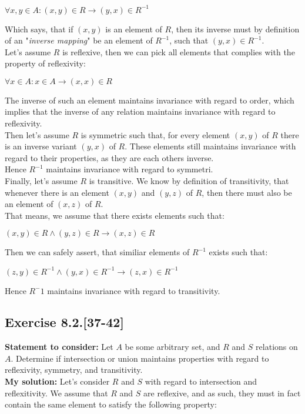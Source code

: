 \documentclass{report}
\newcommand{\cent}[1]{\begin{center}#1\end{center}}
\newcommand{\In}{\! \in \!}
\newcommand{\assignmentDescription}{\textbf{Statement to consider: }}
\newcommand{\solution}{\textbf{My solution: }}
\newcommand{\Exercise}[1]{\subsection{Exercise #1}}
\begin{document}
	\cent{$\forall x,y \In A : (x,y) \In R \to (y,x) \In R^{-1}$}
	
	Which says, that if  $(x,y)$ is an element of $R$, then its inverse must by definition of an "\textit{inverse mapping}" be an element of $R^{-1}$, such that $(y,x) \In R^{-1}$.\\
	
	Let's assume $R$ is reflexive, then we can pick all elements that complies with the property of reflexivity:
	
	\cent{$\forall x \In A : x \In A \to (x,x) \In R$}
	
	The inverse of such an element maintains invariance with regard to order, which implies that the inverse of any relation maintains invariance with regard to reflexivity.\\
	
	Then let's assume $R$ is symmetric such that, for every element $ (x,y) $ of $R$  there is an inverse variant $ (y,x) $ of $R$. These elements still maintains invariance with regard to their properties, as they are each others inverse.\\ 
	
	Hence $R^{-1}$ maintains invariance with regard to symmetri.\\
	
	Finally, let's assume $R$ is transitive. We know by definition of transitivity, that whenever there is an element $(x,y)$ and $ (y,z) $ of $R$, then there must also be an element of $(x,z)$ of $R$.\\
	
	That means, we assume that there exists elements such that:
	
	\cent{$ (x,y) \In R \wedge (y,z) \In R \to (x,z)\In R$}
	
	Then we can safely assert, that similiar elements of  $R^{-1}$ exists such that:
	
	\cent{$ (z,y) \In R^{-1} \wedge (y,x) \In R^{-1} \to (z,x)\In R^{-1}$}
	
	Hence $R^-1$ maintains invariance with regard to transitivity.
	
	\Exercise{8.2.[37-42]}
	
	\assignmentDescription
	Let $A$ be some arbitrary set, and $R$ and $S$ relations on $A$. Determine if intersection or union maintains properties with regard to reflexivity, symmetry, and transitivity.\\
	
	\solution
	Let's consider $R$ and $S$ with regard to intersection and reflexitivity. We assume that $R$ and $S$ are reflexive, and as such, they must in fact contain the same element to satisfy the following property:
	
\end{document}
